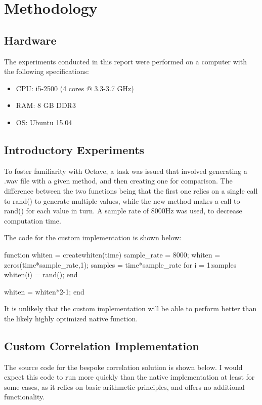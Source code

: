 \section{Methodology}

\subsection{Hardware}
The experiments conducted in this report were performed on a computer with the following specifications:
\begin{itemize}
	\item CPU: i5-2500 (4 cores @ 3.3-3.7	GHz)
	\item RAM: 8 GB DDR3
	\item OS:  Ubuntu 15.04
\end{itemize}

\subsection{Introductory Experiments}
To foster familiarity with Octave, a task was issued that involved generating a .wav file with a given method, and then creating one for comparison. The difference between the two functions being that the first one relies on a single call to rand() to generate multiple values, while the new method makes a call to rand() for each value in turn. A sample rate of 8000Hz was used, to decrease computation time. 


The code for the custom implementation is shown below:

\begin{Matlab}
function whiten = createwhiten(time)
  sample_rate = 8000;
  whiten = zeros(time*sample_rate,1);
  samples = time*sample_rate
  for i = 1:samples
    whiten(i) = rand();
  end
  
  whiten = whiten*2-1; %
end
\end{Matlab}

It is unlikely that the custom implementation will be able to perform better than the likely highly optimized native function.

\subsection{Custom Correlation Implementation}
The source code for the bespoke correlation solution is shown below. I would expect this code to run more quickly than the native implementation at least for some cases, as it relies on basic arithmetic principles, and offers no additional functionality.

